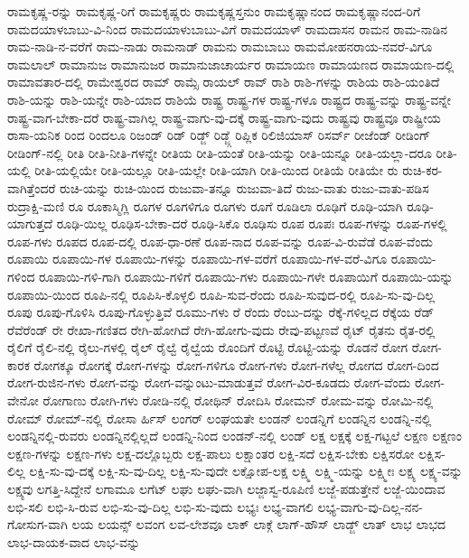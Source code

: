 {ರಾಮಕೃಷ್ಣ-ರನ್ನು
ರಾಮಕೃಷ್ಣ-ರಿಗೆ
ರಾಮಕೃಷ್ಣರು
ರಾಮಕೃಷ್ಣಸ್ತನುಂ
ರಾಮಕೃಷ್ಣಾನಂದ
ರಾಮಕೃಷ್ಣಾನಂದ-ರಿಗೆ
ರಾಮದಯಾಳಬಾಬು-ವಿ-ನಿಂದ
ರಾಮದಯಾಳುಬಾಬು-ವಿಗೆ
ರಾಮದಯಾಳ್
ರಾಮದಾಸನ
ರಾಮನ
ರಾಮ-ನಾಡಿನ
ರಾಮ-ನಾಡಿ-ನ-ವರೆಗೆ
ರಾಮ-ನಾಡು
ರಾಮನಾಡ್
ರಾಮನು
ರಾಮಬಾಬು
ರಾಮಮೋಹನರಾಯ-ನವರೆ-ವಿಗೂ
ರಾಮಲಾಲ್
ರಾಮಾನುಜ
ರಾಮಾನುಜರ
ರಾಮಾನುಜಾಚಾರ್ಯರ
ರಾಮಾಯಣ
ರಾಮಾಯಣದ
ರಾಮಾಯಣ-ದಲ್ಲಿ
ರಾಮಾವತಾರ-ದಲ್ಲಿ
ರಾಮೇಶ್ವರದ
ರಾಮ್
ರಾಮ್ಸೆ
ರಾಯಲ್
ರಾವ್
ರಾಶಿ
ರಾಶಿ-ಗಳನ್ನು
ರಾಶಿಯ
ರಾಶಿ-ಯಂತಿದೆ
ರಾಶಿ-ಯನ್ನು
ರಾಶಿ-ಯನ್ನೇ
ರಾಶಿ-ಯಾದ
ರಾಶಿಯೆ
ರಾಷ್ಟ್ರ
ರಾಷ್ಟ್ರ-ಗಳ
ರಾಷ್ಟ್ರ-ಗಳೂ
ರಾಷ್ಟ್ರದ
ರಾಷ್ಟ್ರ-ವನ್ನು
ರಾಷ್ಟ್ರ-ವನ್ನೇ
ರಾಷ್ಟ್ರ-ವಾಗ-ಬೇಕಾ-ದರೆ
ರಾಷ್ಟ್ರ-ವಾಗಿಲ್ಲ
ರಾಷ್ಟ್ರ-ವಾಗು-ವು-ದಕ್ಕೆ
ರಾಷ್ಟ್ರ-ವಾಗು-ವುದು
ರಾಷ್ಟ್ರವು
ರಾಷ್ಟ್ರವೂ
ರಾಷ್ಟ್ರೀಯ
ರಾಸಾ-ಯನಿಕ
ರಿಂದ
ರಿಂದಲೂ
ರಿಜಂಡ್
ರಿಡ್
ರಿಡ್ಜ್
ರಿಡ್ಜ್ಗೆ
ರಿಪ್ಲಿಕ
ರಿಲಿಜಿಯಾಸ್
ರಿಸರ್ವ್
ರೀಜೆಂಡ್
ರೀಡಿಂಗ್
ರೀಡಿಂಗ್-ನಲ್ಲಿ
ರೀತಿ
ರೀತಿ-ನೀತಿ-ಗಳನ್ನೇ
ರೀತಿಯ
ರೀತಿ-ಯಂತೆ
ರೀತಿ-ಯನ್ನು
ರೀತಿ-ಯನ್ನೂ
ರೀತಿ-ಯಲ್ಲಾ-ದರೂ
ರೀತಿ-ಯಲ್ಲಿ
ರೀತಿ-ಯಲ್ಲಿಯೇ
ರೀತಿ-ಯಲ್ಲೂ
ರೀತಿ-ಯಲ್ಲೇ
ರೀತಿ-ಯಾಗಿ
ರೀತಿ-ಯಿಂದ
ರೀತಿಯೆ
ರೀತಿಯೇ
ರು
ರುಚಿ-ಕರ-ವಾಗಿತ್ತೆಂದರೆ
ರುಚಿ-ಯನ್ನು
ರುಚಿ-ಯಿಂದ
ರುಜುವಾ-ತನ್ನೂ
ರುಜುವಾ-ತಿದೆ
ರುಜು-ವಾತು
ರುಜು-ವಾತು-ಪಡಿಸ
ರುದ್ರಾಕ್ಷಿ-ಮಣಿ
ರೂ
ರೂಕಾಸ್ಮಿಗ್ಲಿ
ರೂಗಳ
ರೂಗಳಿಗೂ
ರೂಗಳು
ರೂಗೆ
ರೂಡಿಲಾ
ರೂಢಿಗೆ
ರೂಢಿ-ಯಾಗಿ
ರೂಢಿ-ಯಾಗುತ್ತದೆ
ರೂಢಿ-ಯಿಲ್ಲ
ರೂಢಿಸ-ಬೇಕಾ-ದರೆ
ರೂಢಿ-ಸಿಕೊ
ರೂಢಿಸು
ರೂಪ
ರೂಪಃ
ರೂಪ-ಗಳನ್ನು
ರೂಪ-ಗಳಲ್ಲಿ
ರೂಪ-ಗಳು
ರೂಪದ
ರೂಪ-ದಲ್ಲಿ
ರೂಪ-ಧಾ-ರಣೆ
ರೂಪ-ನಾದ
ರೂಪ-ವನ್ನು
ರೂಪ-ವಿ-ರುವೆಡೆ
ರೂಪ-ವೆಂದು
ರೂಪಾಯಿ
ರೂಪಾಯಿ-ಗಳ
ರೂಪಾಯಿ-ಗಳನ್ನು
ರೂಪಾಯಿ-ಗಳ-ವರೆಗೆ
ರೂಪಾಯಿ-ಗಳ-ವರೆ-ವಿಗೂ
ರೂಪಾಯಿ-ಗಳಿಂದ
ರೂಪಾಯಿ-ಗಳಿ-ಗಾಗಿ
ರೂಪಾಯಿ-ಗಳಿಗೆ
ರೂಪಾಯಿ-ಗಳು
ರೂಪಾಯಿ-ಗಳೇ
ರೂಪಾಯಿಗೆ
ರೂಪಾಯಿ-ಯನ್ನು
ರೂಪಾಯಿ-ಯಿಂದ
ರೂಪಿ-ನಲ್ಲಿ
ರೂಪಿಸಿ-ಕೊಳ್ಳಲಿ
ರೂಪಿ-ಸುವ-ರೆಂದು
ರೂಪಿ-ಸುವುದ-ರಲ್ಲಿ
ರೂಪಿ-ಸು-ವು-ದಿಲ್ಲ
ರೂಪು
ರೂಪು-ಗೊಳಿಸಿ
ರೂಪು-ಗೊಳ್ಳುತ್ತಿವೆ
ರೂಮು-ಗಳು
ರೆ
ರೆಂದು
ರೆಂಬು-ದನ್ನು
ರೆಕ್ಕೆ-ಗಳಿಲ್ಲದ
ರೆಕ್ಕೆಯ
ರೆಡ್
ರೆವೆರೆಂಡ್
ರೇ
ರೇಖಾ-ಗಣಿತದ
ರೇಗಿ-ಹೋಗಿದೆ
ರೇಗಿ-ಹೋಗು-ವುದು
ರೇವು-ಪಟ್ಟಣವೆ
ರೈಟ್
ರೈತನು
ರೈತ-ರಲ್ಲಿ
ರೈಲಿಗೆ
ರೈಲಿ-ನಲ್ಲಿ
ರೈಲು-ಗಳಲ್ಲಿ
ರೈಲ್
ರೈಲ್ವೆ
ರೈಲ್ವೆಯ
ರೊಂದಿಗೆ
ರೊಟ್ಟಿ
ರೊಟ್ಟಿ-ಯನ್ನು
ರೊಡನೆ
ರೋಗ
ರೋಗ-ಕಾರಕ
ರೋಗಕ್ಕೂ
ರೋಗಕ್ಕೆ
ರೋಗ-ಗಳನ್ನು
ರೋಗ-ಗಳಿಗೂ
ರೋಗ-ಗಳು
ರೋಗ-ಗಳೆಲ್ಲ
ರೋಗದ
ರೋಗ-ದಿಂದ
ರೋಗ-ರುಜಿನ-ಗಳು
ರೋಗ-ವನ್ನು
ರೋಗ-ವನ್ನುಂಟು-ಮಾಡುತ್ತವೆ
ರೋಗ-ವಿರ-ಕೂಡದು
ರೋಗ-ವೆಂದು
ರೋಗ-ವೇನೋ
ರೋಗಾಣು
ರೋಗಿ-ಗಳು
ರೋಡಿ-ನಲ್ಲಿ
ರೋಥಿನ್
ರೋದಿಸಿ
ರೋಮನ್
ರೋಮ-ವನ್ನು
ರೋಮಿ-ನಲ್ಲಿ
ರೋಮ್
ರೋಮ್-ನಲ್ಲಿ
ರೋಸಾ
ರ್ಹಿಸ್
ಲಂಗರ್
ಲಂಘಯತೇ
ಲಂಡನ್
ಲಂಡನ್ನಿಗೆ
ಲಂಡನ್ನಿನ
ಲಂಡನ್ನಿ-ನಲ್ಲಿ
ಲಂಡನ್ನಿನಲ್ಲಿ-ರುವರು
ಲಂಡನ್ನಿನಲ್ಲಿಲ್ಲದೆ
ಲಂಡನ್ನಿ-ನಿಂದ
ಲಂಡನ್-ನಲ್ಲಿ
ಲಂಡ್
ಲಕ್ಷ
ಲಕ್ಷಕ್ಕೆ
ಲಕ್ಷ-ಗಟ್ಟಲೆ
ಲಕ್ಷಣ
ಲಕ್ಷಣಂ
ಲಕ್ಷಣ-ಗಳನ್ನು
ಲಕ್ಷಣ-ಗಳು
ಲಕ್ಷ-ದಲ್ಲೊಬ್ಬರು
ಲಕ್ಷ-ಪಾಲು
ಲಕ್ಷಾಂತರ
ಲಕ್ಷಿ-ಸದೆ
ಲಕ್ಷಿಸ-ಬೇಕು
ಲಕ್ಷಿಸರೋ
ಲಕ್ಷಿಸ-ಲಿಲ್ಲ
ಲಕ್ಷಿ-ಸು-ವು-ದಕ್ಕೆ
ಲಕ್ಷಿ-ಸು-ವು-ದಿಲ್ಲ
ಲಕ್ಷಿ-ಸು-ವುದೇ
ಲಕ್ಷೋಪ-ಲಕ್ಷ
ಲಕ್ಷ್ಮಿ
ಲಕ್ಷ್ಮಿ-ಯನ್ನು
ಲಕ್ಷ್ಮೀಃ
ಲಕ್ಷ್ಯ
ಲಕ್ಷ್ಯ-ವನ್ನು
ಲಕ್ಷ್ಯವು
ಲಗತ್ತಿ-ಸಿದ್ದೇನೆ
ಲಗಾಮೂ
ಲಗೆಟ್
ಲಘು
ಲಘು-ವಾಗಿ
ಲಜ್ಜಾಸ್ವ-ರೂಪಿಣಿ
ಲಜ್ಜೆ-ಪಡುತ್ತೇನೆ
ಲಜ್ಜೆ-ಯಿಂದಾವ
ಲಭಿ-ಸಲಿ
ಲಭಿ-ಸಿ-ರುವ
ಲಭಿ-ಸು-ವು-ದಿಲ್ಲ
ಲಭಿ-ಸು-ವುದು
ಲಭ್ಯಃ
ಲಭ್ಯ-ವಾಗಲಿ
ಲಭ್ಯ-ವಾಗು-ವು-ದಿಲ್ಲ-ನನ-ಗೋಸುಗ-ವಾಗಿ
ಲಯ
ಲಯನ್ಸ್
ಲವಂಗ
ಲವ-ಲೇಶವೂ
ಲಾಕ್
ಲಾಕ್ಗೆ
ಲಾಗ್-ಹೌಸ್
ಲಾಡ್ಜ್
ಲಾತ್
ಲಾಭ
ಲಾಭದ
ಲಾಭ-ದಾಯಕ-ವಾದ
ಲಾಭ-ವನ್ನು
}
